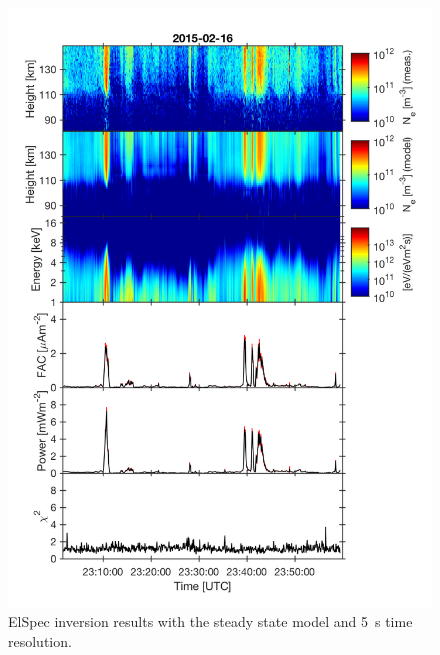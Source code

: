 \documentclass[12pt,a4paper]{report}
\begin{document}
\begin{figure}[ht]
\begin{center}
\includegraphics[width=\textwidth]{ElSpec_20150216T230135-20150216T235955_beata_uhf_Fang_SheehanGr_equilibrium_6_1_dump.png}
\caption{ElSpec inversion results with the steady state model and 5~s time resolution. }
\label{figElSpecOutEquilibrium}
\end{center}
\end{figure}
\end{document}
